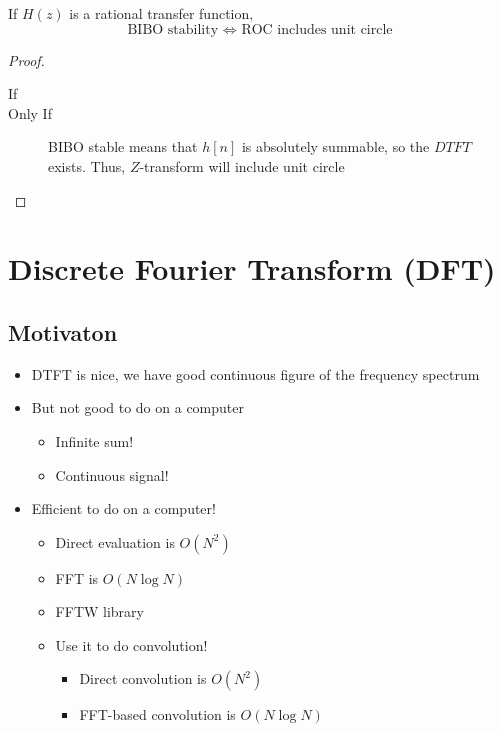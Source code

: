 \documentclass{report}
\begin{document}
\begin{theorem}
    If $H(z)$ is a rational transfer function,
    \begin{equation*}
        \text{BIBO stability } \iff \text{ ROC includes unit circle}
    \end{equation*}
    \begin{proof}
        \begin{description}
            \item[If]
            \item[Only If] 
        BIBO stable means that $h[n]$ is absolutely summable, so the $DTFT$ exists. Thus, $Z$-transform will include unit circle
        \end{description}
    \end{proof}
\end{theorem}


\section{Discrete Fourier Transform (DFT)}
\subsection{Motivaton}

\begin{itemize}
    \item DTFT is nice, we have good continuous figure of the frequency spectrum

    \item But not good to do on a computer
    \begin{itemize}
        \item Infinite sum!
        \item Continuous signal!
    \end{itemize}

    \item Efficient to do on a computer!
    \begin{itemize}
        \item Direct evaluation is $O(N^2)$
        \item FFT is $O(N \log N)$
        \item FFTW library
        \item Use it to do convolution!
        \begin{itemize}
            \item Direct convolution is $O(N^2)$
            \item FFT-based convolution is $O(N \log N)$
        \end{itemize}
    \end{itemize}
\end{itemize}
\end{document}
